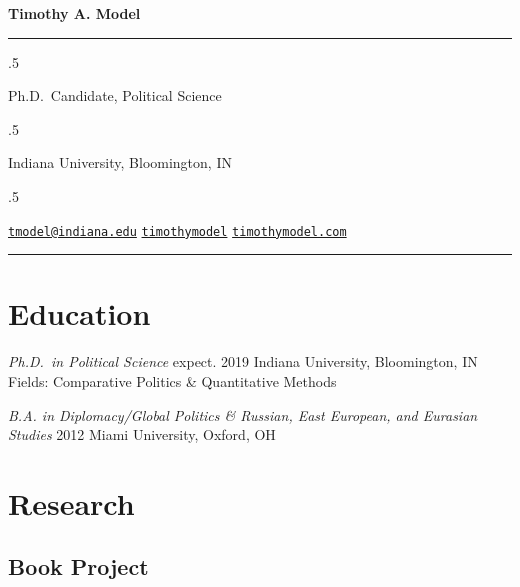 \documentclass[11pt,]{article}
\begin{document}
\centerline{\huge \bf Timothy A. Model}

\vspace{2 mm}

\hrule

\vspace{2 mm}

\moveleft.5\hoffset\centerline{Ph.D.~Candidate, Political Science}
\moveleft.5\hoffset\centerline{Indiana University, Bloomington, IN}
\moveleft.5\hoffset\centerline{ \faEnvelopeO \hspace{1 mm} \href{mailto:}{\tt \href{mailto:tmodel@indiana.edu}{\nolinkurl{tmodel@indiana.edu}}} \hspace{1 mm}  \faGithub \hspace{1 mm} \href{http://github.com/timothymodel}{\tt timothymodel} \hspace{1 mm}    \faGlobe \hspace{1 mm} \href{http://timothymodel.com}{\tt timothymodel.com}   }

\vspace{2 mm}

\hrule


\hypertarget{education}{%
\section{Education}\label{education}}

\vspace{-2mm}

\emph{Ph.D.~in Political Science} \hfill expect. 2019 \break Indiana
University, Bloomington, IN \hfill \break Fields: Comparative Politics
\& Quantitative Methods

\emph{B.A. in Diplomacy/Global Politics \& Russian, East European, and
Eurasian Studies} \hfill 2012 \break Miami University, Oxford, OH

\vspace{-2mm}

\hypertarget{research}{%
\section{Research}\label{research}}

\vspace{-2mm}

\hypertarget{book-project}{%
\subsection{Book Project}\label{book-project}}
\end{document}
